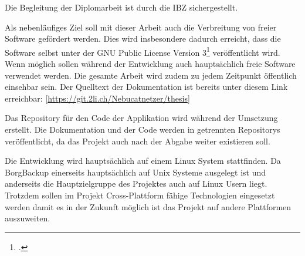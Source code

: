 Die Begleitung der Diplomarbeit ist durch die IBZ sichergestellt.

Als nebenläufiges Ziel soll mit dieser Arbeit auch die Verbreitung von freier
Software gefördert werden. Dies wird insbesondere dadurch erreicht, dass die
Software selbst unter der GNU Public License Version 3\footcite{gplv3}
veröffentlicht wird. Wenn möglich sollen während der Entwicklung auch
hauptsächlich freie Software verwendet werden. Die gesamte Arbeit wird zudem zu
jedem Zeitpunkt öffentlich einsehbar sein. Der Quelltext der Dokumentation ist
bereits unter diesem Link erreichbar: [\url{https://git.2li.ch/Nebucatnetzer/thesis}]

Das Repository für den Code der Applikation wird während der Umsetzung erstellt.
Die Dokumentation und der Code werden in getrennten Repositorys veröffentlicht,
da das Projekt auch nach der Abgabe weiter existieren soll.

Die Entwicklung wird hauptsächlich auf einem Linux System stattfinden. Da
BorgBackup einerseits hauptsächlich auf Unix Systeme ausgelegt ist und
anderseits die Hauptzielgruppe des Projektes auch auf Linux Usern liegt.
Trotzdem sollen im Projekt Cross-Plattform fähige Technologien eingesetzt werden
damit es in der Zukunft möglich ist das Projekt auf andere Plattformen
auszuweiten.

